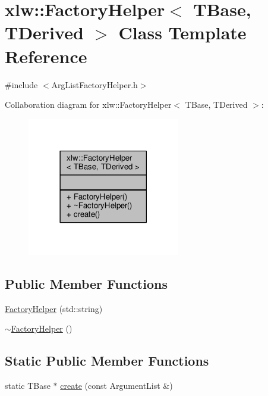 \hypertarget{classxlw_1_1FactoryHelper}{}\section{xlw\+:\+:Factory\+Helper$<$ T\+Base, T\+Derived $>$ Class Template Reference}
\label{classxlw_1_1FactoryHelper}


{\ttfamily \#include $<$Arg\+List\+Factory\+Helper.\+h$>$}



Collaboration diagram for xlw\+:\+:Factory\+Helper$<$ T\+Base, T\+Derived $>$\+:
\nopagebreak
\begin{figure}[H]
\begin{center}
\leavevmode
\includegraphics[width=189pt]{classxlw_1_1FactoryHelper__coll__graph}
\end{center}
\end{figure}
\subsection*{Public Member Functions}
\begin{DoxyCompactItemize}
\item 
\hyperlink{classxlw_1_1FactoryHelper_a44de841ec0fc63247dbf75810ada63ba}{Factory\+Helper} (std\+::string)
\item 
\hyperlink{classxlw_1_1FactoryHelper_afc7bf132e7c347c5f606b7ba4d7c7131}{$\sim$\+Factory\+Helper} ()
\end{DoxyCompactItemize}
\subsection*{Static Public Member Functions}
\begin{DoxyCompactItemize}
\item 
static T\+Base $\ast$ \hyperlink{classxlw_1_1FactoryHelper_a5505b444732c858b81701508dec1dbbf}{create} (const Argument\+List \&)
\end{DoxyCompactItemize}



